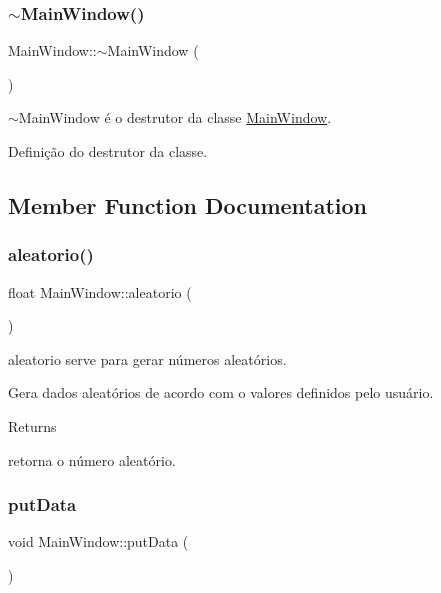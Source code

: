 \subsubsection{\texorpdfstring{$\sim$\+Main\+Window()}{~MainWindow()}}
{\footnotesize\ttfamily Main\+Window\+::$\sim$\+Main\+Window (\begin{DoxyParamCaption}{ }\end{DoxyParamCaption})}



$\sim$\+Main\+Window é o destrutor da classe \mbox{\hyperlink{class_main_window}{Main\+Window}}. 

Definição do destrutor da classe. 

\subsection{Member Function Documentation}
\mbox{\label{class_main_window_ab29e2b2ee8118c9d36c45820309a9093}} 
\subsubsection{\texorpdfstring{aleatorio()}{aleatorio()}}
{\footnotesize\ttfamily float Main\+Window\+::aleatorio (\begin{DoxyParamCaption}{ }\end{DoxyParamCaption})}



aleatorio serve para gerar números aleatórios. 

Gera dados aleatórios de acordo com o valores definidos pelo usuário.

\begin{DoxyReturn}{Returns}


retorna o número aleatório. 
\end{DoxyReturn}
\mbox{\label{class_main_window_afdfeb13ec363b0eb8ecacaf0aa13b605}} 
\subsubsection{\texorpdfstring{put\+Data}{putData}}
{\footnotesize\ttfamily void Main\+Window\+::put\+Data (\begin{DoxyParamCaption}{ }\end{DoxyParamCaption})\hspace{0.3cm}{\ttfamily [slot]}}



